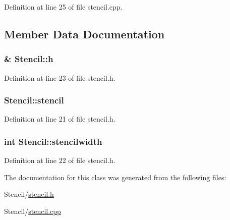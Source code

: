 Definition at line 25 of file stencil.\-cpp.



\subsection{Member Data Documentation}
\hypertarget{class_stencil_a249ecd9a5cb33e46c115ad132df011c1}{
\subsubsection[{h}]{\& Stencil\-::h}}\label{dd/d3a/class_stencil_a249ecd9a5cb33e46c115ad132df011c1}


Definition at line 23 of file stencil.\-h.

\hypertarget{class_stencil_a73fd87ad5880d4a3a4cecc63712a0642}{
\subsubsection[{stencil}]{ Stencil\-::stencil}}\label{dd/d3a/class_stencil_a73fd87ad5880d4a3a4cecc63712a0642}


Definition at line 21 of file stencil.\-h.

\hypertarget{class_stencil_a8543574d7ac8d3571ba703aad105c1b8}{
\subsubsection[{stencilwidth}]{\setlength{\rightskip}{0pt plus 5cm}int Stencil\-::stencilwidth}}\label{dd/d3a/class_stencil_a8543574d7ac8d3571ba703aad105c1b8}


Definition at line 22 of file stencil.\-h.



The documentation for this class was generated from the following files\-:\begin{DoxyCompactItemize}
\item 
Stencil/\hyperlink{stencil_8h}{stencil.\-h}\item 
Stencil/\hyperlink{stencil_8cpp}{stencil.\-cpp}\end{DoxyCompactItemize}
